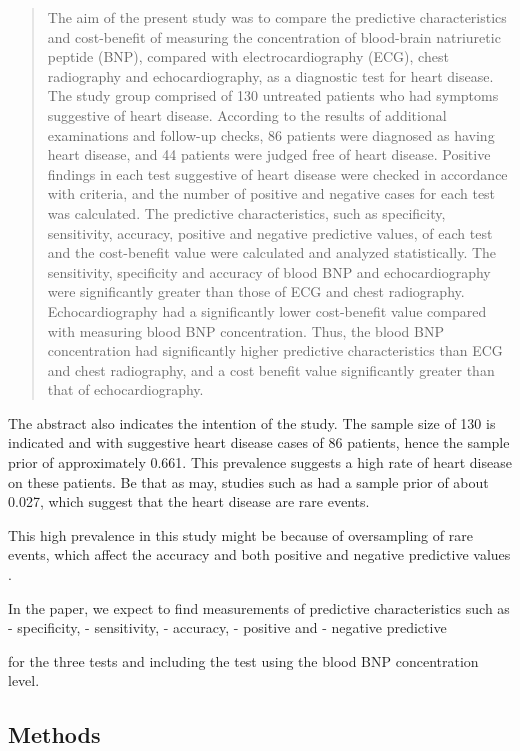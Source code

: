 \documentclass[11pt]{article}
\begin{document}
\begin{quote}
The aim of the present study was to compare the predictive
characteristics and cost-benefit of measuring the concentration of
blood-brain natriuretic peptide (BNP), compared with electrocardiography
(ECG), chest radiography and echocardiography, as a diagnostic test for
heart disease. The study group comprised of 130 untreated patients who
had symptoms suggestive of heart disease. According to the results of
additional examinations and follow-up checks, 86 patients were diagnosed
as having heart disease, and 44 patients were judged free of heart
disease. Positive findings in each test suggestive of heart disease were
checked in accordance with criteria, and the number of positive and
negative cases for each test was calculated. The predictive
characteristics, such as specificity, sensitivity, accuracy, positive
and negative predictive values, of each test and the cost-benefit value
were calculated and analyzed statistically. The sensitivity, specificity
and accuracy of blood BNP and echocardiography were significantly
greater than those of ECG and chest radiography. Echocardiography had a
significantly lower cost-benefit value compared with measuring blood BNP
concentration. Thus, the blood BNP concentration had significantly
higher predictive characteristics than ECG and chest radiography, and a
cost benefit value significantly greater than that of echocardiography.
\end{quote}

The abstract also indicates the intention of the study. The sample size
of 130 is indicated and with suggestive heart disease cases of 86
patients, hence the sample prior of approximately 0.661. This prevalence
suggests a high rate of heart disease on these patients. Be that as may,
studies such as \cite{4980048/2GX3J5M9} had a sample prior of about
0.027, which suggest that the heart disease are rare events.

This high prevalence in this study might be because of oversampling of
rare events, which affect the accuracy and both positive and negative
predictive values \cite{undefined}.

In the paper, we expect to find measurements of predictive
characteristics such as - specificity, - sensitivity, - accuracy, -
positive and - negative predictive

for the three tests and including the test using the blood BNP
concentration level.

    \hypertarget{methods}{%
\subsection{\texorpdfstring{\textbf{Methods}}{Methods}}\label{methods}}
\end{document}
